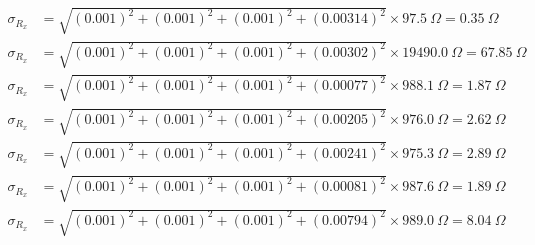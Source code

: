 \documentclass[UTF8]{ctexart}
\begin{document}
\begin{align*}
    \sigma_{R_x} &= \sqrt{\left( 0.001\right)^2 +
    \left( 0.001\right)^2  + \left( 0.001\right)^2 + \left( 0.00314\right)^2} \times 97.5 \ \Omega  = 0.35 \ \Omega\\
    \sigma_{R_x} &= \sqrt{\left( 0.001\right)^2 +
    \left( 0.001\right)^2  + \left( 0.001\right)^2 + \left( 0.00302\right)^2} \times 19490.0 \ \Omega  = 67.85 \ \Omega\\
    \sigma_{R_x} &= \sqrt{\left( 0.001\right)^2 +
    \left( 0.001\right)^2  + \left( 0.001\right)^2 + \left( 0.00077\right)^2} \times 988.1 \ \Omega  = 1.87 \ \Omega\\
    \sigma_{R_x} &= \sqrt{\left( 0.001\right)^2 +
    \left( 0.001\right)^2  + \left( 0.001\right)^2 + \left( 0.00205\right)^2} \times 976.0 \ \Omega  = 2.62 \ \Omega\\
    \sigma_{R_x} &= \sqrt{\left( 0.001\right)^2 +
    \left( 0.001\right)^2  + \left( 0.001\right)^2 + \left( 0.00241\right)^2} \times 975.3 \ \Omega  = 2.89 \ \Omega\\
    \sigma_{R_x} &= \sqrt{\left( 0.001\right)^2 +
    \left( 0.001\right)^2  + \left( 0.001\right)^2 + \left( 0.00081\right)^2} \times 987.6 \ \Omega  = 1.89\ \Omega\\
    \sigma_{R_x} &= \sqrt{\left( 0.001\right)^2 +
    \left( 0.001\right)^2  + \left( 0.001\right)^2 + \left( 0.00794\right)^2} \times 989.0 \ \Omega  = 8.04 \ \Omega
\end{align*}
\end{document}
